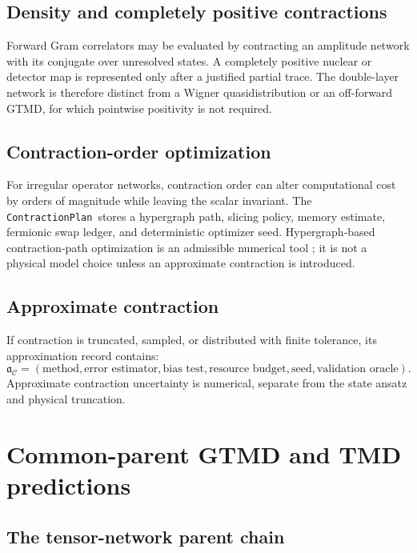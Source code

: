 \documentclass[11pt]{article}
\newcommand{\cC}{\mathcal C}
\newcommand{\ContractionPlan}{\texttt{ContractionPlan}}
\begin{document}
\subsection{Density and completely positive contractions}

Forward Gram correlators may be evaluated by contracting an amplitude network
with its conjugate over unresolved states.  A completely positive nuclear or
detector map is represented only after a justified partial trace.  The
double-layer network is therefore distinct from a Wigner quasidistribution or
an off-forward GTMD, for which pointwise positivity is not required.

\subsection{Contraction-order optimization}

For irregular operator networks, contraction order can alter computational
cost by orders of magnitude while leaving the scalar invariant.  The
\ContractionPlan\ stores a hypergraph path, slicing policy, memory estimate,
fermionic swap ledger, and deterministic optimizer seed.  Hypergraph-based
contraction-path optimization is an admissible numerical tool
\cite{GrayKourtis2021}; it is not a physical model choice unless an
approximate contraction is introduced.

\subsection{Approximate contraction}

If contraction is truncated, sampled, or distributed with finite tolerance,
its approximation record contains:
\begin{equation}
 \mathfrak a_{\cC}=
 \left(
 \text{method},\text{error estimator},\text{bias test},
 \text{resource budget},\text{seed},\text{validation oracle}
 \right).
\label{eq:approx-contraction-record}
\end{equation}
Approximate contraction uncertainty is numerical, separate from the state
ansatz and physical truncation.

\section{Common-parent GTMD and TMD predictions}
\label{sec:tmd-predictions}

\subsection{The tensor-network parent chain}
\end{document}
